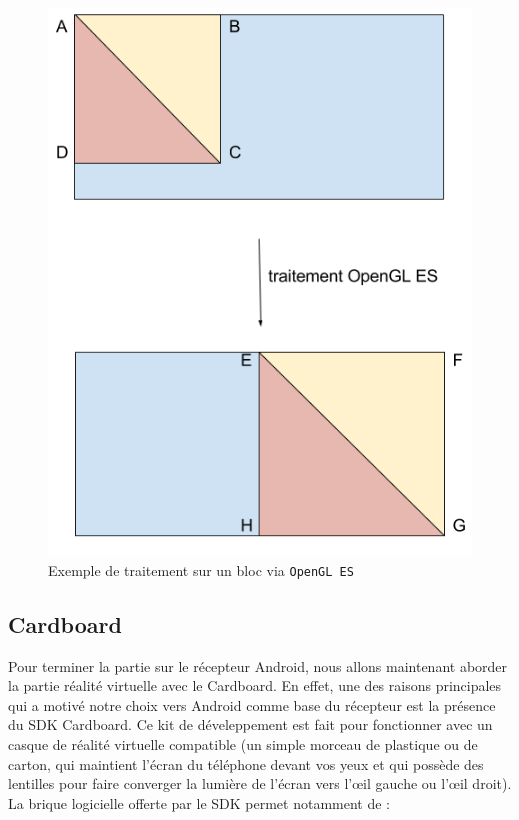 \documentclass[11pt,a4paper]{article}
\begin{document}
\begin{figure}[H]
\begin{center}
\includegraphics[scale=0.35]{images/OpenGL_ES.png}
\end{center}
\caption{Exemple de traitement sur un bloc via \texttt{OpenGL ES}}
\label{}
\end{figure}

\subsection{Cardboard}
Pour terminer la partie sur le récepteur Android, nous allons maintenant aborder la partie réalité virtuelle avec le Cardboard.
En effet, une des raisons principales qui a motivé notre choix vers Android comme base du récepteur est la présence du SDK Cardboard.
Ce kit de déveleppement est fait pour fonctionner avec un casque de réalité virtuelle compatible (un simple morceau de plastique ou de carton, qui maintient l'écran du téléphone devant vos yeux et qui possède des lentilles pour faire converger la lumière de l'écran vers l'œil gauche ou l'œil droit).
La brique logicielle offerte par le SDK permet notamment de :
\end{document}
